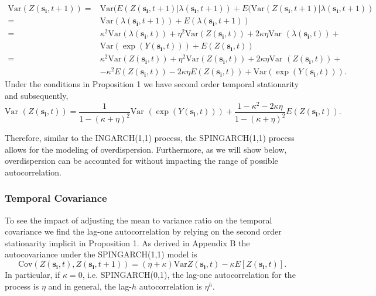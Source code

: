 \documentclass[11pt]{isuthesis}
\begin{document}
\begin{align}
	\mbox{Var}(Z(\boldsymbol{s_i},t+1))  =& \mbox{Var}(E(Z(\boldsymbol{s_i},t+1)|\lambda(\boldsymbol{s_i},t+1))+E(\mbox{Var}(Z(\boldsymbol{s_i},t+1)|\lambda(\boldsymbol{s_i},t+1))\\
	=& \mbox{Var}(\lambda(\boldsymbol{s_i},t+1))+ E(\lambda(\boldsymbol{s_i},t+1))\nonumber\\
	= & \kappa^2 \mbox{Var} (\lambda(\boldsymbol{s_i},t))+\eta^2 \mbox{Var}(Z(\boldsymbol{s_i},t))+2 \kappa \eta \mbox{Var }(\lambda(\boldsymbol{s_i},t))+\nonumber\\
	& \mbox{Var}(\exp(Y(\boldsymbol{s_i},t)))+E(Z(\boldsymbol{s_i},t))\\
	=&\kappa^2 \mbox{Var} (Z(\boldsymbol{s_i},t))+\eta^2 \mbox{Var}(Z(\boldsymbol{s_i},t))+2 \kappa \eta \mbox{Var }(Z(\boldsymbol{s_i},t))+\nonumber \nonumber\\
	& - \kappa^2 E(Z(\boldsymbol{s_i},t))-2 \kappa \eta E(Z(\boldsymbol{s_i},t))+\mbox{Var} (\exp(Y(\boldsymbol{s_i},t))).
\end{align}
Under the conditions in Proposition 1 we have second order temporal stationarity and subsequently,
\begin{equation}
	\mbox{Var }(Z(\boldsymbol{s_i},t))=\frac{1}{1-(\kappa+\eta)^2} \mbox{Var }(\exp(Y(\boldsymbol{s_i},t)))+\frac{1-\kappa^2-2\kappa \eta}{1-(\kappa+\eta)^2}E(Z(\boldsymbol{s_i},t)).
\end{equation}

Therefore, similar to the INGARCH(1,1) process, the SPINGARCH(1,1) process allows for the modeling of overdispersion.  Furthermore, as we will show below, overdispersion can be accounted for without impacting the range of possible autocorrelation.


\subsubsection{Temporal Covariance}

To see the impact of adjusting the mean to variance ratio on the temporal covariance we find the lag-one autocorrelation by relying on the second order stationarity implicit in Proposition 1.  As derived in Appendix B the autocovariance under the SPINGARCH(1,1) model is
\begin{equation}
	\mbox{Cov}(Z(\boldsymbol{s_i},t),Z(\boldsymbol{s_i},t+1))=\left(\eta+\kappa\right)\mbox{Var} Z(\boldsymbol{s_i},t)-\kappa E[Z(\boldsymbol{s_i},t)] \label{eq:Autocov}.
\end{equation}
In particular, if $\kappa=0$, i.e. SPINGARCH(0,1), the lag-one autocorrelation for the process is $\eta$ and in general, the lag-$h$ autocorrelation is $\eta^h$.  
\end{document}
